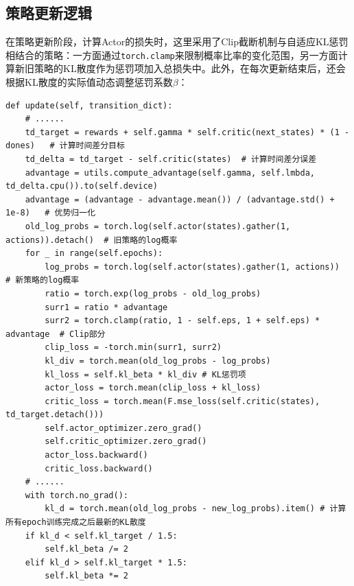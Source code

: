 \documentclass[11pt]{article}
\begin{document}
    \subsection{策略更新逻辑}
    在策略更新阶段，计算Actor的损失时，这里采用了Clip截断机制与自适应KL惩罚相结合的策略：一方面通过\lstinline|torch.clamp|来限制概率比率的变化范围，另一方面计算新旧策略的KL散度作为惩罚项加入总损失中。此外，在每次更新结束后，还会根据KL散度的实际值动态调整惩罚系数$\beta$：
    \begin{lstlisting}
def update(self, transition_dict):
    # ......
    td_target = rewards + self.gamma * self.critic(next_states) * (1 - dones)   # 计算时间差分目标
    td_delta = td_target - self.critic(states)  # 计算时间差分误差
    advantage = utils.compute_advantage(self.gamma, self.lmbda, td_delta.cpu()).to(self.device)
    advantage = (advantage - advantage.mean()) / (advantage.std() + 1e-8)   # 优势归一化
    old_log_probs = torch.log(self.actor(states).gather(1, actions)).detach()  # 旧策略的log概率
    for _ in range(self.epochs):
        log_probs = torch.log(self.actor(states).gather(1, actions))    # 新策略的log概率
        ratio = torch.exp(log_probs - old_log_probs)
        surr1 = ratio * advantage
        surr2 = torch.clamp(ratio, 1 - self.eps, 1 + self.eps) * advantage  # Clip部分
        clip_loss = -torch.min(surr1, surr2)
        kl_div = torch.mean(old_log_probs - log_probs)
        kl_loss = self.kl_beta * kl_div # KL惩罚项
        actor_loss = torch.mean(clip_loss + kl_loss)
        critic_loss = torch.mean(F.mse_loss(self.critic(states), td_target.detach()))  
        self.actor_optimizer.zero_grad()
        self.critic_optimizer.zero_grad()
        actor_loss.backward()
        critic_loss.backward()
    # ......
    with torch.no_grad():
        kl_d = torch.mean(old_log_probs - new_log_probs).item() # 计算所有epoch训练完成之后最新的KL散度
    if kl_d < self.kl_target / 1.5:
        self.kl_beta /= 2
    elif kl_d > self.kl_target * 1.5:
        self.kl_beta *= 2
    \end{lstlisting}
\end{document}
